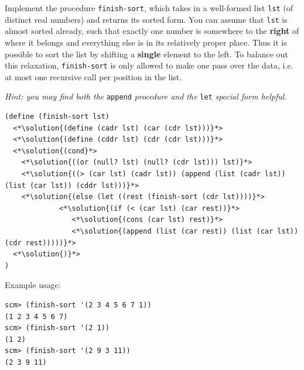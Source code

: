 \documentclass[twoside]{article}
\newcommand{\solution}[1]{{\color{red}#1}}
\newcommand\solution[1]{} %
\begin{document}
\begin{enumerate}

Implement the procedure \texttt{finish-sort}, which takes in a well-formed list \texttt{lst} (of distinct real numbers) and returns its sorted form. You can assume that \texttt{lst} is almost sorted already, such that exactly one number is somewhere to the \textbf{right} of where it belongs and everything else is in its relatively proper place. Thus it is possible to sort the list by shifting a \textbf{single} element to the left. To balance out this relaxation, \texttt{finish-sort} is only allowed to make one pass over the data, i.e. at most one recursive call per position in the list.

\textit{Hint: you may find both the} \texttt{append} \textit{procedure and the} \texttt{let} \textit{special form helpful.}

\begin{lstlisting}
(define (finish-sort lst)
  <*\solution{(define (cadr lst) (car (cdr lst)))}*>
  <*\solution{(define (cddr lst) (cdr (cdr lst)))}*>
  <*\solution{(cond}*>
    <*\solution{((or (null? lst) (null? (cdr lst))) lst)}*>
    <*\solution{((> (car lst) (cadr lst)) (append (list (cadr lst)) (list (car lst)) (cddr lst)))}*>
    <*\solution{(else (let ((rest (finish-sort (cdr lst))))}*>
             <*\solution{(if (< (car lst) (car rest))}*>
                <*\solution{(cons (car lst) rest)}*>
                <*\solution{(append (list (car rest)) (list (car lst)) (cdr rest)))))}*>
  <*\solution{)}*>
)
\end{lstlisting}

Example usage:

\begin{lstlisting}
scm> (finish-sort '(2 3 4 5 6 7 1))
(1 2 3 4 5 6 7)
scm> (finish-sort '(2 1))
(1 2)
scm> (finish-sort '(2 9 3 11))
(2 3 9 11)
\end{lstlisting}

\end{enumerate}
\end{document}
